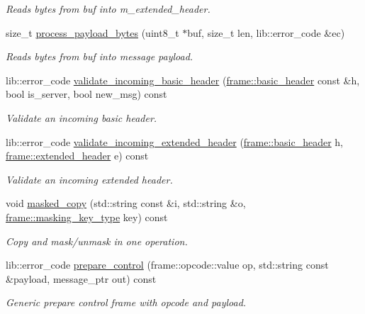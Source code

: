 \begin{DoxyCompactItemize}
\begin{DoxyCompactList}\small\item\em Reads bytes from buf into m\+\_\+extended\+\_\+header. \end{DoxyCompactList}\item 
size\+\_\+t \hyperlink{classwebsocketpp_1_1processor_1_1hybi13_aa7eece3f48840535f41b625061fa7867}{process\+\_\+payload\+\_\+bytes} (uint8\+\_\+t $\ast$buf, size\+\_\+t len, lib\+::error\+\_\+code \&ec)
\begin{DoxyCompactList}\small\item\em Reads bytes from buf into message payload. \end{DoxyCompactList}\item 
lib\+::error\+\_\+code \hyperlink{classwebsocketpp_1_1processor_1_1hybi13_a0c549a5e2766288fb625c03e507cc9ad}{validate\+\_\+incoming\+\_\+basic\+\_\+header} (\hyperlink{structwebsocketpp_1_1frame_1_1basic__header}{frame\+::basic\+\_\+header} const \&h, bool is\+\_\+server, bool new\+\_\+msg) const
\begin{DoxyCompactList}\small\item\em Validate an incoming basic header. \end{DoxyCompactList}\item 
lib\+::error\+\_\+code \hyperlink{classwebsocketpp_1_1processor_1_1hybi13_aee8565136bb0820e9a8914dfc5fdb753}{validate\+\_\+incoming\+\_\+extended\+\_\+header} (\hyperlink{structwebsocketpp_1_1frame_1_1basic__header}{frame\+::basic\+\_\+header} h, \hyperlink{structwebsocketpp_1_1frame_1_1extended__header}{frame\+::extended\+\_\+header} e) const
\begin{DoxyCompactList}\small\item\em Validate an incoming extended header. \end{DoxyCompactList}\item 
void \hyperlink{classwebsocketpp_1_1processor_1_1hybi13_a888318b2773af49d458313a96a817a7a}{masked\+\_\+copy} (std\+::string const \&i, std\+::string \&o, \hyperlink{unionwebsocketpp_1_1frame_1_1uint32__converter}{frame\+::masking\+\_\+key\+\_\+type} key) const
\begin{DoxyCompactList}\small\item\em Copy and mask/unmask in one operation. \end{DoxyCompactList}\item 
lib\+::error\+\_\+code \hyperlink{classwebsocketpp_1_1processor_1_1hybi13_a5aa8f27959beeeef73997a80c2560663}{prepare\+\_\+control} (frame\+::opcode\+::value op, std\+::string const \&payload, message\+\_\+ptr out) const
\begin{DoxyCompactList}\small\item\em Generic prepare control frame with opcode and payload. \end{DoxyCompactList}\end{DoxyCompactItemize}
